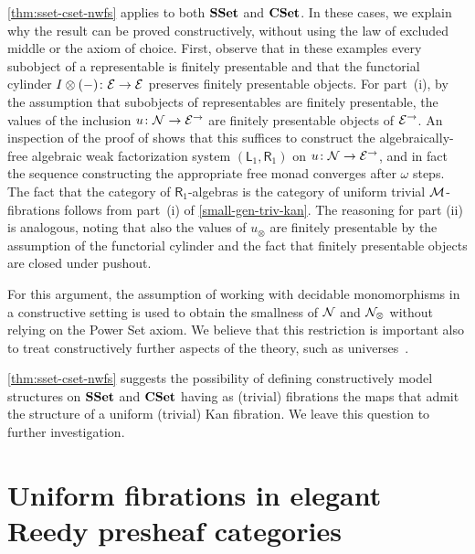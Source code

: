 \documentclass[reqno,10pt,a4paper,oneside,draft]{amsart}
\begin{document}
\begin{remark} \label{rem:constructive-small-object}
\cref{thm:sset-cset-nwfs} applies to both $\SSet$ and $\CSet$. In these cases, we explain why the result can be proved
 constructively, \ie without using 
the law of excluded middle or the axiom of choice. 
First, observe that in these examples every subobject of a representable is finitely presentable and that the functorial cylinder $\interval \otimes (-) \co \cal{E} \to \cal{E}$ preserves finitely presentable objects. For part~(i), by the assumption that subobjects of representables are finitely presentable, the values of the inclusion $u \co \cal{N} \to \cal{E}^\to$ are finitely presentable objects of $\cal{E}^\to$.
An inspection of the proof of \cite[Theorem~4.4]{garner:small-object-argument} shows that this suffices to construct the algebraically-free algebraic weak factorization system $(\mathsf{L}_1, \mathsf{R}_1)$ on $u \co \cal{N} \to \cal{E}^\to$, and in fact the sequence constructing the appropriate free monad converges after $\omega$ steps. 
The fact that the category of $\mathsf{R}_1$-algebras is the category of uniform trivial $\cal{M}$-fibrations follows from part~(i) of \cref{small-gen-triv-kan}.
The reasoning for part (ii) is analogous, noting that also the values of $u_\otimes$ are finitely presentable by the assumption of the functorial cylinder and the fact that finitely presentable objects are closed under pushout. 

For this argument, the assumption of working with decidable monomorphisms in a constructive setting is used
to obtain the smallness of $\cal{N}$ and $\cal{N}_\otimes$ without relying on the Power Set axiom. We believe 
that this restriction is important also to treat constructively further aspects of the theory, such as universes~\cite{cohen-et-al:cubicaltt}.

\cref{thm:sset-cset-nwfs} suggests the possibility of defining constructively model structures on $\SSet$ and $\CSet$ having as (trivial) fibrations the maps that admit the structure of a uniform (trivial) Kan fibration.
We leave this question to further investigation. 


\end{remark} 





\section{Uniform fibrations in elegant Reedy presheaf categories}
\label{sec:non-alg}
\end{document}
